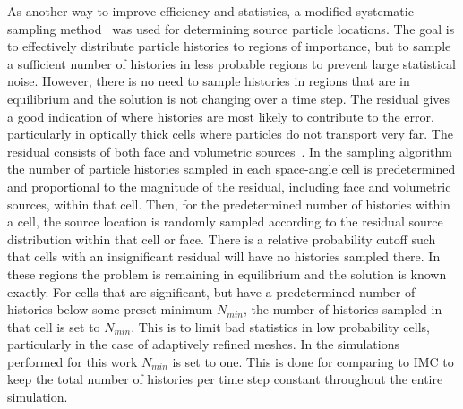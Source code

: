 \documentclass{mc2013}
\begin{document}
As another way to improve efficiency and statistics, a modified systematic
sampling
method~\cite{shultis_mc} was used for determining source particle locations.  The goal is to effectively distribute particle
histories to regions of importance, but to sample a sufficient number of histories in
less probable regions to prevent large statistical noise.  However, there is no need
to sample histories in regions that are in equilibrium and the solution is not
changing over a time step.
The residual gives a good indication of where
histories are most likely to contribute to the error, particularly in optically thick
cells where particles do not transport very far.  The residual consists of both face
and volumetric sources~\cite{jake}.   
In the sampling algorithm the number of particle histories sampled in
each space-angle cell is predetermined and proportional to the magnitude of the
residual, including face and volumetric sources, within that cell.  Then, for the predetermined number of histories within a cell, the source
location is randomly sampled according to the residual source distribution within
that cell or face.  There is
a relative probability cutoff such that cells with an insignificant
residual will have no histories sampled there. In these regions the problem is
remaining in equilibrium and the solution is known exactly.  
For cells that are significant, but have a predetermined number of histories below some preset
minimum $N_{min}$, the number of histories sampled in that cell is set to
$N_{min}$. This is to limit
bad statistics in low probability cells, particularly in the case of adaptively
refined meshes.  In the simulations performed for this work $N_{min}$ is set to one.
This is done for comparing to IMC to keep the total number of histories per time step
constant throughout the entire simulation.
\end{document}
